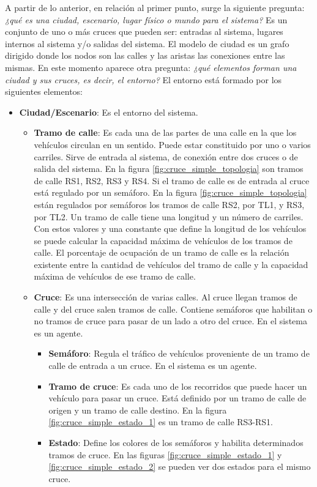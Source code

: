 A partir de lo anterior, en relación al primer punto, surge la siguiente pregunta: \textit{¿qué es una ciudad, escenario, lugar físico o mundo para el sistema?} Es un conjunto de uno o más cruces que pueden ser: entradas al sistema, lugares internos al sistema y/o salidas del sistema. El modelo de ciudad es un grafo dirigido donde los nodos son las calles y las aristas las conexiones entre las mismas. En este momento aparece otra pregunta: \textit{¿qué elementos forman una ciudad y sus cruces, es decir, el entorno?} El entorno está formado por los siguientes elementos:
\begin{itemize}
    \item \textbf{Ciudad/Escenario}: Es el entorno del sistema.
    \begin{itemize}
        \item \textbf{Tramo de calle}: Es cada una de las partes de una calle en la que los vehículos circulan en un sentido. Puede estar constituido por uno o varios carriles. Sirve de entrada al sistema, de conexión entre dos cruces o de salida del sistema. En la figura \ref{fig:cruce_simple_topologia} son tramos de calle RS1, RS2, RS3 y RS4. Si el tramo de calle es de entrada al cruce está regulado por un semáforo. En la figura \ref{fig:cruce_simple_topologia} están regulados por semáforos los tramos de calle RS2, por TL1, y RS3, por TL2. \newline 
        Un tramo de calle tiene una longitud y un número de carriles. Con estos valores y una constante que define la longitud de los vehículos se puede calcular la capacidad máxima de vehículos de los tramos de calle. El porcentaje de ocupación de un tramo de calle es la relación existente entre la cantidad de vehículos del tramo de calle y la capacidad máxima de vehículos de ese tramo de calle.
        \item \textbf{Cruce}: Es una intersección de varias calles. Al cruce llegan tramos de calle y del cruce salen tramos de calle. Contiene semáforos que habilitan o no tramos de cruce para pasar de un lado a otro del cruce. En el sistema es un agente.
        \begin{itemize}
            \item \textbf{Semáforo}: Regula el tráfico de vehículos proveniente de un tramo de calle de entrada a un cruce. En el sistema es un agente.
            \item \textbf{Tramo de cruce}: Es cada uno de los recorridos que puede hacer un vehículo para pasar un cruce. Está definido por un tramo de calle de origen y un tramo de calle destino. En la figura \ref{fig:cruce_simple_estado_1} es un tramo de calle RS3-RS1.
            \item \textbf{Estado}: Define los colores de los semáforos y habilita determinados tramos de cruce. En las figuras \ref{fig:cruce_simple_estado_1} y \ref{fig:cruce_simple_estado_2} se pueden ver dos estados para el mismo cruce. 
        \end{itemize}
    \end{itemize}
\end{itemize}

